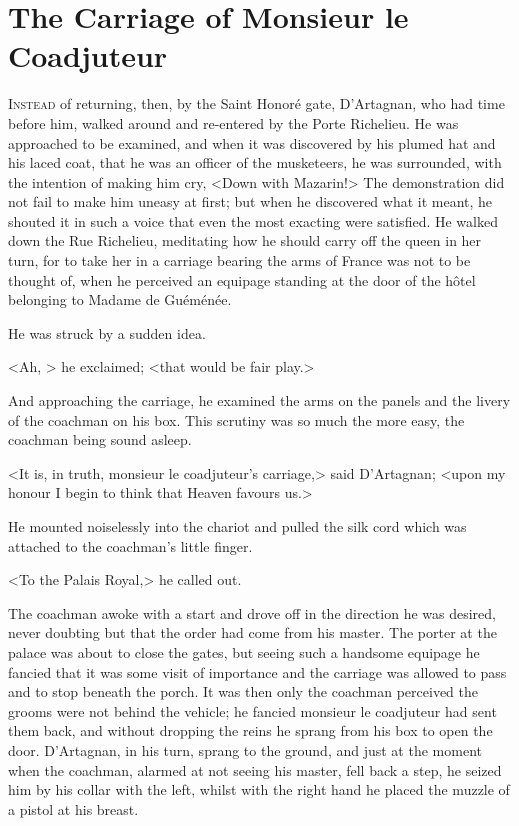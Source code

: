 \chapter{The Carriage of Monsieur le Coadjuteur}

 \lettrine{I}{nstead} of returning, then, by the Saint Honoré gate, D'Artagnan, who had time before him, walked around and re-entered by the Porte Richelieu. He was approached to be examined, and when it was discovered by his plumed hat and his laced coat, that he was an officer of the musketeers, he was surrounded, with the intention of making him cry, <Down with Mazarin!> The demonstration did not fail to make him uneasy at first; but when he discovered what it meant, he shouted it in such a voice that even the most exacting were satisfied. He walked down the Rue Richelieu, meditating how he should carry off the queen in her turn, for to take her in a carriage bearing the arms of France was not to be thought of, when he perceived an equipage standing at the door of the hôtel belonging to Madame de Guéménée.

He was struck by a sudden idea.

<Ah, > he exclaimed; <that would be fair play.>

And approaching the carriage, he examined the arms on the panels and the livery of the coachman on his box. This scrutiny was so much the more easy, the coachman being sound asleep.

<It is, in truth, monsieur le coadjuteur's carriage,> said D'Artagnan; <upon my honour I begin to think that Heaven favours us.>

He mounted noiselessly into the chariot and pulled the silk cord which was attached to the coachman's little finger.

<To the Palais Royal,> he called out.

The coachman awoke with a start and drove off in the direction he was desired, never doubting but that the order had come from his master. The porter at the palace was about to close the gates, but seeing such a handsome equipage he fancied that it was some visit of importance and the carriage was allowed to pass and to stop beneath the porch. It was then only the coachman perceived the grooms were not behind the vehicle; he fancied monsieur le coadjuteur had sent them back, and without dropping the reins he sprang from his box to open the door. D'Artagnan, in his turn, sprang to the ground, and just at the moment when the coachman, alarmed at not seeing his master, fell back a step, he seized him by his collar with the left, whilst with the right hand he placed the muzzle of a pistol at his breast.

